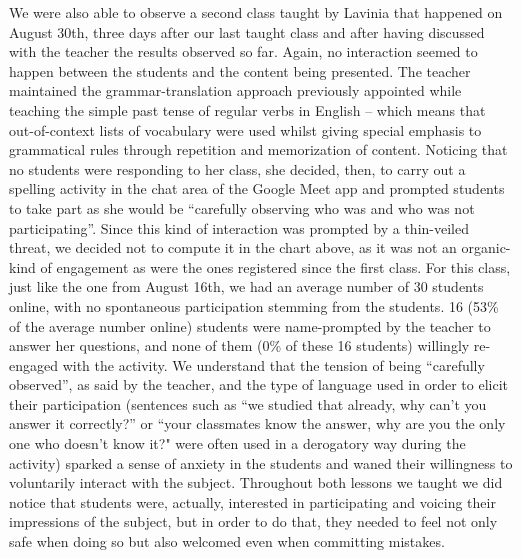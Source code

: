 \documentclass[english]{textolivre}
\begin{document}
We were also able to observe a second class taught by Lavinia that happened on August 30th, three days after our last taught class and after having discussed with the teacher the results observed so far. Again, no interaction seemed to happen between the students and the content being presented. The teacher maintained the grammar-translation approach previously appointed while teaching the simple past tense of regular verbs in English – which means that out-of-context lists of vocabulary were used whilst giving special emphasis to grammatical rules through repetition and memorization of content. Noticing that no students were responding to her class, she decided, then, to carry out a spelling activity in the chat area of the Google Meet app and prompted students to take part as she would be “carefully observing who was and who was not participating”. Since this kind of interaction was prompted by a thin-veiled threat, we decided not to compute it in the chart above, as it was not an organic-kind of engagement as were the ones registered since the first class. For this class, just like the one from August 16th, we had an average number of 30 students online, with no spontaneous participation stemming from the students. 16 (53\% of the average number online) students were name-prompted by the teacher to answer her questions, and none of them (0\% of these 16 students) willingly re-engaged with the activity. We understand that the tension of being “carefully observed”, as said by the teacher, and the type of language used in order to elicit their participation (sentences such as “we studied that already, why can’t you answer it correctly?” or “your classmates know the answer, why are you the only one who doesn't know it?" were often used in a derogatory way during the activity) sparked a sense of anxiety in the students and waned their willingness to voluntarily interact with the subject. Throughout both lessons we taught we did notice that students were, actually, interested in participating and voicing their impressions of the subject, but in order to do that, they needed to feel not only safe when doing so but also welcomed even when committing mistakes.
\end{document}
